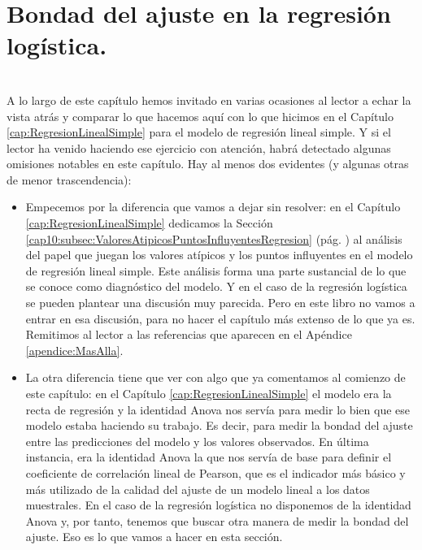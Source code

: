 \section{Bondad del ajuste en la regresión logística.}
\label{cap13:sec:BondadDelAjuste}
\\

A lo largo de este capítulo hemos invitado en varias ocasiones al lector a echar la vista atrás y comparar lo que hacemos aquí con lo que hicimos en el Capítulo \ref{cap:RegresionLinealSimple} para el modelo de regresión lineal simple. Y si el lector ha venido haciendo ese ejercicio con atención, habrá detectado algunas omisiones notables en este capítulo. Hay al menos dos evidentes (y algunas otras de menor trascendencia):

\begin{itemize}
 	\item Empecemos por la diferencia  que vamos a dejar sin resolver: en el   Capítulo \ref{cap:RegresionLinealSimple} dedicamos la Sección \ref{cap10:subsec:ValoresAtipicosPuntosInfluyentesRegresion} (pág. \pageref{cap10:subsec:ValoresAtipicosPuntosInfluyentesRegresion}) al análisis del papel que juegan los valores atípicos y los puntos influyentes en el modelo de regresión lineal simple. Este análisis forma una parte sustancial de lo que se conoce como {\sf diagnóstico del modelo}. Y en el caso de la regresión logística se pueden plantear una discusión muy parecida. Pero en este libro no vamos a entrar en esa discusión, para no hacer el capítulo más extenso de lo que ya es. Remitimos al lector a las referencias que aparecen en el Apéndice \ref{apendice:MasAlla}.

 	\item La otra diferencia tiene que ver con algo que ya comentamos al comienzo de este capítulo: en el Capítulo \ref{cap:RegresionLinealSimple} el modelo era la recta de regresión y la identidad Anova nos servía para medir lo bien que ese modelo estaba haciendo su trabajo. Es decir, para medir la bondad del ajuste entre las predicciones del modelo y los valores observados. En última instancia, era la identidad Anova la que nos servía de base para definir el coeficiente de correlación lineal de Pearson, que es el indicador más básico y más utilizado de la calidad del ajuste de un modelo lineal a los datos muestrales. En el caso de la regresión logística  no disponemos de la identidad Anova y, por tanto, tenemos que buscar otra manera de medir la bondad del ajuste. Eso es lo que vamos a hacer en esta sección.
\end{itemize}

